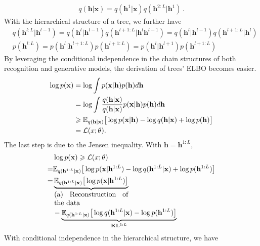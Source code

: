 \documentclass[sigconf, anonymous, review]{acmart}
\theoremstyle{plain}
\theoremstyle{definition}
\theoremstyle{remark}
\begin{document}
\begin{align*} %
q(\mathbf{h}| \mathbf{x}) = q(\mathbf{h}^1 | \mathbf{x})  q(\mathbf{h}^{2:L} | \mathbf{h}^1) \, .
\end{align*}
With the hierarchical structure of a tree, we further have
\begin{align} \label{eq:chain_post}
&q(\mathbf{h}^{l:L}|\mathbf{h}^{l-1}) = q(\mathbf{h}^{l}|\mathbf{h}^{l-1}) q(\mathbf{h}^{l+1:L}|\mathbf{h}^{l}\mathbf{h}^{l-1}) =q(\mathbf{h}^{l}|\mathbf{h}^{l-1}) q(\mathbf{h}^{l+1:L}|\mathbf{h}^{l})  \\ \label{eq:chain_prior}
& p(\mathbf{h}^{l:L})=  p(\mathbf{h}^{l}|\mathbf{h}^{l+1:L})p(\mathbf{h}^{l+1:L})=p(\mathbf{h}^{l}|\mathbf{h}^{l+1})p(\mathbf{h}^{l+1:L})
\end{align}
By leveraging  the conditional independence  in the chain structures of both recognition and generative models, the derivation of trees' ELBO becomes easier.
\begin{align*}
\log p(\mathbf{x}) &= \log \int p(\mathbf{x}|\mathbf{h})p(\mathbf{h}) d \mathbf{h} \\
&= \log \int \frac{q(\mathbf{h}|\mathbf{x})}{q(\mathbf{h}|\mathbf{x})} p(\mathbf{x}|\mathbf{h})p(\mathbf{h}) d \mathbf{h} \\
& \geqslant \mathbb{E}_{q(\mathbf{h}|\mathbf{x})}\big[ \log p(\mathbf{x}|\mathbf{h}) -  \log q(\mathbf{h}|\mathbf{x}) +  \log p(\mathbf{h}) \big]\\ \notag
&= \mathcal{L}(x; \theta).
\end{align*}%
The last step is due to the Jensen inequality. With $\mathbf{h} =\mathbf{h}^{1:L} $, 
\begin{align} \notag  %
&\log p(\mathbf{x})  \geqslant  \mathcal{L}(x; \theta) \\ \notag
=& \mathbb{E}_{q(\mathbf{h}^{1:L}|\mathbf{x})}\big[ \log p(\mathbf{x}|\mathbf{h}^{1:L}) -  \log q(\mathbf{h}^{1:L}|\mathbf{x}) +  \log p(\mathbf{h}^{1:L}) \big] \\ \label{eq:elbo12L}
=&  \underbrace{\mathbb{E}_{q(\mathbf{h}^{1:L}|\mathbf{x})}\big[ \log p(\mathbf{x}|\mathbf{h}^{1:L})\big]}_{\parbox{10.5em}{(a) Reconstruction of the data}}  \\ \notag
&-  \underbrace{\mathbb{E}_{q(\mathbf{h}^{1:L}|\mathbf{x})}\big[ \log q(\mathbf{h}^{1:L}|\mathbf{x}) - \log p(\mathbf{h}^{1:L}) \big] }_{\textbf{\text{KL}}^{1:L}}
\end{align}%
With conditional independence in   the hierarchical structure, we have 
\end{document}
